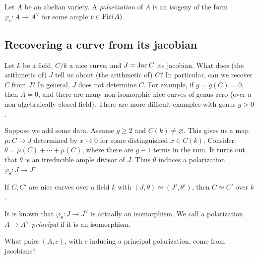 \documentclass{article}
\begin{document}
\begin{definition}
Let $A$ be an abelian variety. A \emph{polarization} of $A$ is an isogeny 
of the form $\varphi_c:A\to A^\vee$ for some ample $c\in \operatorname{Pic}(A)$.
\end{definition}





\subsection*{Recovering a curve from its jacobian}

Let $k$ be a field, $C/k$ a nice curve, and $J=\operatorname{Jac} C$ its jacobian. What does 
(the arithmetic of) $J$ tell us about (the arithmetic of) $C$? In particular, 
can we recover $C$ from $J$? In general, $J$ does not determine $C$. For 
example, if $g=g(C)=0$, then $A=0$, and there are many non-isomorphic nice 
curves of genus zero (over a non-algebraically closed field). There are more 
difficult examples with genus $g>0$. 

Suppose we add some data. Assume $g\geqslant 2$ and $C(k)\ne\varnothing$. This 
gives us a map $\mu:C\to J$ determined by $x\mapsto 0$ for some distinguished 
$x\in C(k)$. Consider $\theta = \mu(C)+\cdots + \mu(C)$, where there are $g-1$ 
terms in the sum. It turns out that $\theta$ is an irreducible ample divisor of 
$J$. Thus $\theta$ induces a polarization $\varphi_\theta:J\to J^\vee$. 

\begin{theorem}[Torelli]
If $C,C'$ are nice curves over a field $k$ with $(J,\theta)\simeq (J',\theta')$, 
then $C\simeq C'$ over $k$. 
\end{theorem}

It is known that $\varphi_\theta:J\to J^\vee$ is actually an isomorphism. We 
call a polarization $A\to A^\vee$ \emph{principal} if it is an isomorphism. 

\begin{question}[Schottky]
What pairs $(A,c)$, with $c$ inducing a principal polarization, come from 
jacobians? 
\end{question}
\end{document}
